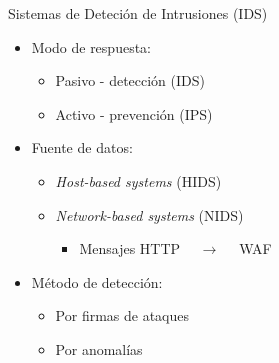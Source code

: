 \begin{frame}
    \begin{exampleblock}{Sistemas de Deteción de Intrusiones (IDS)}
        \begin{itemize}
            \item<2->
            Modo de respuesta:

            \begin{itemize}[<.->]
                \item
                Pasivo - detección (IDS)

                \item
                \alert{Activo - prevención (IPS)}
            \end{itemize}

            \item<3->
            Fuente de datos:

            \begin{itemize}[<.->]
                \item
                \textit{Host-based systems} (HIDS)

                \item
                \alert{\textit{Network-based systems} (NIDS)}

                \begin{itemize}
                    \item
                    \alert{Mensajes HTTP $\quad \rightarrow \quad$ WAF}
                \end{itemize}
            \end{itemize}

            \item<4->
            Método de detección:

            \begin{itemize}[<.->]
                \item
                Por firmas de ataques

                \item
                \alert{Por anomalías}
            \end{itemize}
        \end{itemize}
    \end{exampleblock}
\end{frame}

